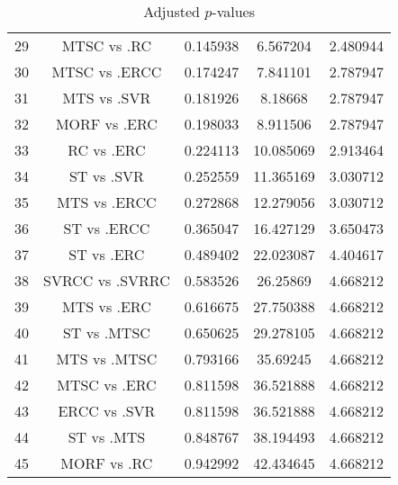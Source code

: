 \documentclass[a4paper,10pt]{article}
\begin{document}
\begin{landscape}
\begin{table}[!htp]
\begin{tabular}{ccccc}
29&MTSC vs .RC&0.145938&6.567204&2.480944\\
30&MTSC vs .ERCC&0.174247&7.841101&2.787947\\
31&MTS vs .SVR&0.181926&8.18668&2.787947\\
32&MORF vs .ERC&0.198033&8.911506&2.787947\\
33&RC vs .ERC&0.224113&10.085069&2.913464\\
34&ST vs .SVR&0.252559&11.365169&3.030712\\
35&MTS vs .ERCC&0.272868&12.279056&3.030712\\
36&ST vs .ERCC&0.365047&16.427129&3.650473\\
37&ST vs .ERC&0.489402&22.023087&4.404617\\
38&SVRCC vs .SVRRC&0.583526&26.25869&4.668212\\
39&MTS vs .ERC&0.616675&27.750388&4.668212\\
40&ST vs .MTSC&0.650625&29.278105&4.668212\\
41&MTS vs .MTSC&0.793166&35.69245&4.668212\\
42&MTSC vs .ERC&0.811598&36.521888&4.668212\\
43&ERCC vs .SVR&0.811598&36.521888&4.668212\\
44&ST vs .MTS&0.848767&38.194493&4.668212\\
45&MORF vs .RC&0.942992&42.434645&4.668212\\
\hline
\end{tabular}
\caption{Adjusted $p$-values}
\end{table}

\end{landscape}
\end{document}
